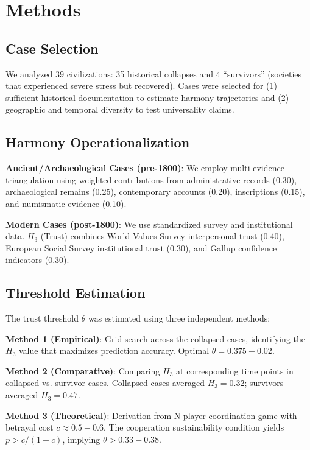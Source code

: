 \documentclass[11pt,a4paper]{article}
\newcommand{\Hthree}{H_3}
\begin{document}
\section{Methods}

\subsection{Case Selection}

We analyzed 39 civilizations: 35 historical collapses and 4 ``survivors'' (societies that experienced severe stress but recovered). Cases were selected for (1) sufficient historical documentation to estimate harmony trajectories and (2) geographic and temporal diversity to test universality claims.

\subsection{Harmony Operationalization}

\textbf{Ancient/Archaeological Cases (pre-1800)}: We employ multi-evidence triangulation using weighted contributions from administrative records (0.30), archaeological remains (0.25), contemporary accounts (0.20), inscriptions (0.15), and numismatic evidence (0.10).

\textbf{Modern Cases (post-1800)}: We use standardized survey and institutional data. $\Hthree$ (Trust) combines World Values Survey interpersonal trust (0.40), European Social Survey institutional trust (0.30), and Gallup confidence indicators (0.30).

\subsection{Threshold Estimation}

The trust threshold $\theta$ was estimated using three independent methods:

\textbf{Method 1 (Empirical)}: Grid search across the collapsed cases, identifying the $\Hthree$ value that maximizes prediction accuracy. Optimal $\theta = 0.375 \pm 0.02$.

\textbf{Method 2 (Comparative)}: Comparing $\Hthree$ at corresponding time points in collapsed vs. survivor cases. Collapsed cases averaged $\Hthree = 0.32$; survivors averaged $\Hthree = 0.47$.

\textbf{Method 3 (Theoretical)}: Derivation from N-player coordination game with betrayal cost $c \approx 0.5-0.6$. The cooperation sustainability condition yields $p > c/(1+c)$, implying $\theta > 0.33-0.38$.
\end{document}
